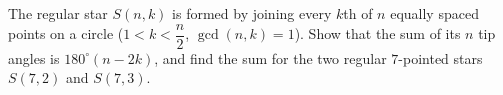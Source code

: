 The regular star $S(n,k)$ is formed by joining every $k$th of $n$ equally spaced points on a circle ($1<k<\dfrac n2$, $\gcd(n,k)=1$). Show that the sum of its $n$ tip angles is $180^\circ(n-2k)$, and find the sum for the two regular $7$-pointed stars $S(7,2)$ and $S(7,3)$.
